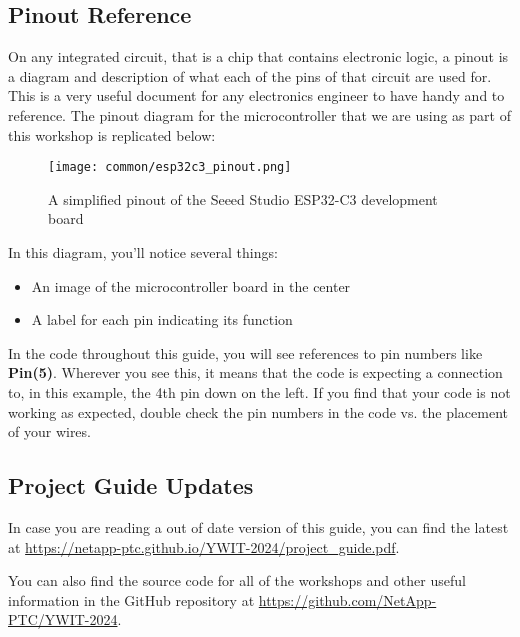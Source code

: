 \subsection{Pinout Reference} \label{pinout}
On any integrated circuit, that is a chip that contains electronic logic, a pinout is
a diagram and description of what each of the pins of that circuit are used for. This is
a very useful document for any electronics engineer to have handy and to reference. The
pinout diagram for the microcontroller that we are using as part of this workshop is
replicated below:
\begin{figure}[H]
\centering
    \texttt{[image: common/esp32c3\_pinout.png]}
    \caption{A simplified pinout of the Seeed Studio ESP32-C3 development board}
\end{figure}

In this diagram, you'll notice several things:
\begin{itemize}
    \item An image of the microcontroller board in the center
    \item A label for each pin indicating its function
\end{itemize}

In the code throughout this guide, you will see references to pin numbers like \textbf{Pin(5)}.
Wherever you see this, it means that the code is expecting a connection to, in this example, the
4th pin down on the left. If you find that your code is not working as expected, double check the
pin numbers in the code vs. the placement of your wires.

\subsection{Project Guide Updates}

In case you are reading a out of date version of this guide, you can find the latest at
\url{https://netapp-ptc.github.io/YWIT-2024/project_guide.pdf}.

You can also find the source code for all of the workshops and other useful information in the GitHub
repository at \url{https://github.com/NetApp-PTC/YWIT-2024}.
